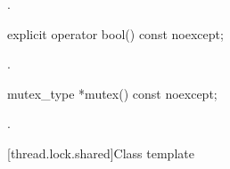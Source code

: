 \begin{itemdescr}
\pnum\returns {}.
\end{itemdescr}

%
\begin{itemdecl}
explicit operator bool() const noexcept;
\end{itemdecl}

\begin{itemdescr}
\pnum\returns {}.
\end{itemdescr}

%
\begin{itemdecl}
mutex_type *mutex() const noexcept;
\end{itemdecl}

\begin{itemdescr}
\pnum\returns {}.
\end{itemdescr}

[thread.lock.shared]{Class template }


